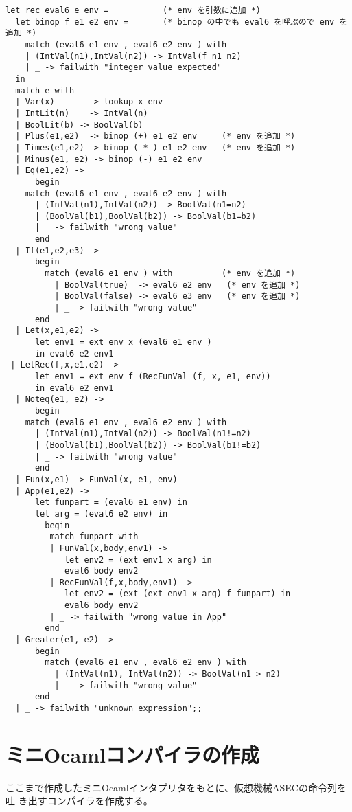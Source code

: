 \documentclass[a4paper,9pt]{jsarticle}
\begin{document}
\begin{lstlisting}
let rec eval6 e env =           (* env を引数に追加 *)
  let binop f e1 e2 env =       (* binop の中でも eval6 を呼ぶので env を追加 *)
    match (eval6 e1 env , eval6 e2 env ) with
    | (IntVal(n1),IntVal(n2)) -> IntVal(f n1 n2)
    | _ -> failwith "integer value expected"
  in 
  match e with
  | Var(x)       -> lookup x env
  | IntLit(n)    -> IntVal(n)
  | BoolLit(b) -> BoolVal(b)
  | Plus(e1,e2)  -> binop (+) e1 e2 env     (* env を追加 *)
  | Times(e1,e2) -> binop ( * ) e1 e2 env   (* env を追加 *)
  | Minus(e1, e2) -> binop (-) e1 e2 env
  | Eq(e1,e2) ->
      begin
	match (eval6 e1 env , eval6 e2 env ) with
	  | (IntVal(n1),IntVal(n2)) -> BoolVal(n1=n2)
	  | (BoolVal(b1),BoolVal(b2)) -> BoolVal(b1=b2)
	  | _ -> failwith "wrong value"
      end
  | If(e1,e2,e3) ->
      begin
        match (eval6 e1 env ) with          (* env を追加 *)
          | BoolVal(true)  -> eval6 e2 env   (* env を追加 *)
          | BoolVal(false) -> eval6 e3 env   (* env を追加 *)
          | _ -> failwith "wrong value"
      end
  | Let(x,e1,e2) -> 
      let env1 = ext env x (eval6 e1 env )
      in eval6 e2 env1 
 | LetRec(f,x,e1,e2) ->
      let env1 = ext env f (RecFunVal (f, x, e1, env))
      in eval6 e2 env1
  | Noteq(e1, e2) ->
      begin
	match (eval6 e1 env , eval6 e2 env ) with
	  | (IntVal(n1),IntVal(n2)) -> BoolVal(n1!=n2)
	  | (BoolVal(b1),BoolVal(b2)) -> BoolVal(b1!=b2)
	  | _ -> failwith "wrong value"
      end
  | Fun(x,e1) -> FunVal(x, e1, env)
  | App(e1,e2) ->
      let funpart = (eval6 e1 env) in
      let arg = (eval6 e2 env) in
        begin
         match funpart with
         | FunVal(x,body,env1) ->
            let env2 = (ext env1 x arg) in
            eval6 body env2
         | RecFunVal(f,x,body,env1) ->
            let env2 = (ext (ext env1 x arg) f funpart) in
            eval6 body env2
         | _ -> failwith "wrong value in App"
        end
  | Greater(e1, e2) -> 
      begin
        match (eval6 e1 env , eval6 e2 env ) with
          | (IntVal(n1), IntVal(n2)) -> BoolVal(n1 > n2)
          | _ -> failwith "wrong value"
      end
  | _ -> failwith "unknown expression";;
\end{lstlisting}

\section{ミニOcamlコンパイラの作成}
ここまで作成したミニOcamlインタプリタをもとに、仮想機械ASECの命令列を吐
き出すコンパイラを作成する。
\end{document}
